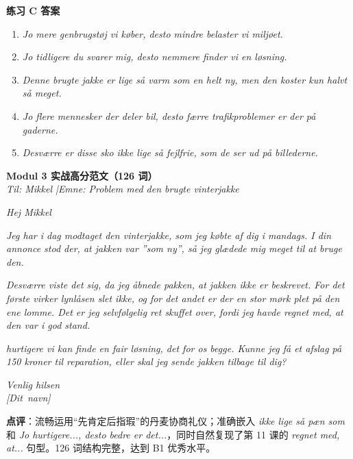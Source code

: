 \begin{answerbox}
\textbf{练习 C 答案}
\begin{enumerate}
  \item \textit{Jo mere genbrugstøj vi køber, desto mindre belaster vi miljøet.}
  \item \textit{Jo tidligere du svarer mig, desto nemmere finder vi en løsning.}
  \item \textit{Denne brugte jakke er lige så varm som en helt ny, men den koster kun halvt så meget.}
  \item \textit{Jo flere mennesker der deler bil, desto færre trafikproblemer er der på gaderne.}
  \item \textit{Desværre er disse sko ikke lige så fejlfrie, som de ser ud på billederne.}
\end{enumerate}

\textbf{Modul 3 实战高分范文（126 词）}\\
\textit{Til: Mikkel \quad|\quad Emne: Problem med den brugte vinterjakke}

\textit{Hej Mikkel}

\textit{Jeg har i dag modtaget den vinterjakke, som jeg købte af dig i mandags. I din annonce stod der, at jakken var ”som ny”, så jeg glædede mig meget til at bruge den.}

\textit{Desværre viste det sig, da jeg åbnede pakken, at jakken ikke er  beskrevet. For det første virker lynlåsen slet ikke, og for det andet er der en stor mørk plet på den ene lomme. Det er jeg selvfølgelig ret skuffet over, fordi jeg havde regnet med, at den var i god stand.}

\textit{ hurtigere vi kan finde en fair løsning,  det for os begge. Kunne jeg få et afslag på 150 kroner til reparation, eller skal jeg sende jakken tilbage til dig?}

\textit{Venlig hilsen\\
\mbox{[Dit navn]}}

\small\textbf{点评}：流畅运用“先肯定后指瑕”的丹麦协商礼仪；准确嵌入 \textit{ikke lige så pæn som} 和 \textit{Jo hurtigere..., desto bedre er det...}，同时自然复现了第 11 课的 \textit{regnet med, at...} 句型。126 词结构完整，达到 B1 优秀水平。
\end{answerbox}